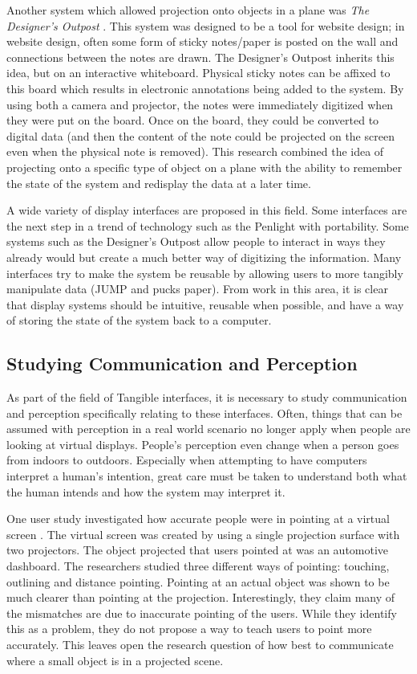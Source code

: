 Another system which allowed projection onto objects in a plane was \emph{The Designer's Outpost} \cite{502350}.  This system was designed to be a tool for website design; in website design, often some form of sticky notes/paper is posted on the wall and connections between the notes are drawn.  The Designer's Outpost inherits this idea, but on an interactive whiteboard.  Physical sticky notes can be affixed to this board which results in electronic annotations being added to the system.  By using both a camera and projector, the notes were immediately digitized when they were put on the board.  Once on the board, they could be converted to digital data (and then the content of the note could be projected on the screen even when the physical note is removed).  This research combined the idea of projecting onto a specific type of object on a plane with the ability to remember the state of the system and redisplay the data at a later time.

A wide variety of display interfaces are proposed in this field.  Some interfaces are the next step in a trend of technology such as the Penlight with portability.  Some systems such as the Designer's Outpost allow people to interact in ways they already would but create a much better way of digitizing the information.  Many interfaces try to make the system be reusable by allowing users to more tangibly manipulate data (JUMP and pucks paper). From work in this area, it is clear that display systems should be intuitive, reusable when possible, and have a way of storing the state of the system back to a computer. 

\subsection{Studying Communication and Perception}

As part of the field of Tangible interfaces, it is necessary to study communication and perception specifically relating to these interfaces.  Often, things that can be assumed with perception in a real world scenario no longer apply when people are looking at virtual displays.  People's perception even change when a person goes from indoors to outdoors. Especially when attempting to have computers interpret a human's intention, great care must be taken to understand both what the human intends and how the system may interpret it.

One user study investigated how accurate people were in pointing at a virtual screen \cite{4811011}. The virtual screen was created by using a single projection surface with two projectors. The object projected that users pointed at was an automotive dashboard. The researchers studied three different ways of pointing: touching, outlining and distance pointing. Pointing at an actual object was shown to be much clearer than pointing at the projection. Interestingly, they claim many of the mismatches are due to inaccurate pointing of the users. While they identify this as a problem, they do not propose a way to teach users to point more accurately. This leaves open the research question of how best to communicate where a small object is in a projected scene.

